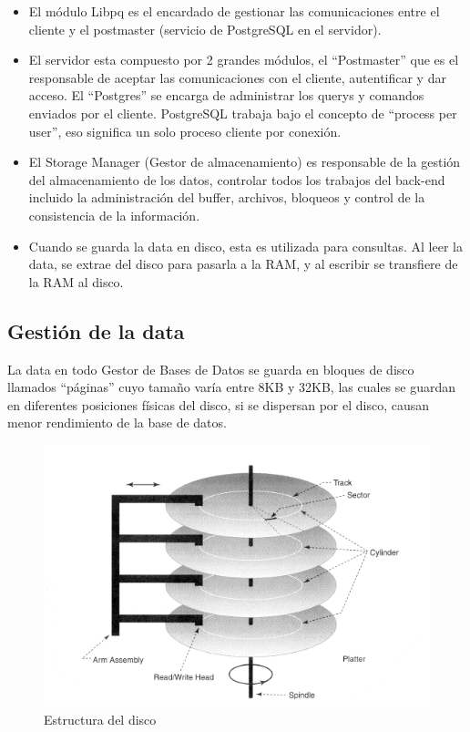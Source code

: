 \begin{itemize}
\item El módulo Libpq es el encardado de gestionar las comunicaciones entre el cliente y el postmaster (servicio de PostgreSQL en el servidor).
\item El servidor esta compuesto por 2 grandes módulos, el “Postmaster” que es el responsable de aceptar las comunicaciones con el cliente, autentificar y dar acceso. El “Postgres” se encarga de administrar los querys y comandos enviados por el cliente. PostgreSQL trabaja bajo el concepto de “process per user”, eso significa un solo proceso cliente por conexión.
\item El Storage Manager (Gestor de almacenamiento) es responsable de la gestión del almacenamiento de los datos, controlar todos los trabajos del back-end incluido la administración del buffer, archivos, bloqueos y control de la consistencia de la información.
\item Cuando se guarda la data en disco, esta es utilizada para consultas. Al leer la data, se extrae del disco para pasarla a la RAM, y al escribir se transfiere de la RAM al disco. \cite{Quinones}
\end{itemize}

\subsection{Gestión de la data}

La data en todo Gestor de Bases de Datos se guarda en bloques de disco llamados “páginas” cuyo tamaño varía entre 8KB y 32KB, las cuales se guardan en diferentes posiciones físicas del disco, si se dispersan por el disco, causan menor rendimiento de la base de datos.\\	

\begin{figure}[ht!]
   \centering
   \includegraphics[scale=1]{imagenes/disk_structure.jpg}
   \caption{Estructura del disco}\label{graf:disk-achitecture}
\end{figure}

